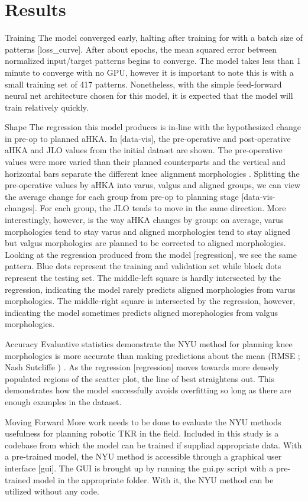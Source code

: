 \documentclass{article}
\begin{document}
	
\section{Results}

Training
	The model converged early, halting after training for \epochs with a batch size of \batchsize patterns [loss\_curve].
After about \convergence epochs, the mean squared error between normalized input/target patterns begins to converge.
The model takes less than 1 minute to converge with no GPU, however it is important to note this is with a small training set of 417 patterns.
Nonetheless, with the simple feed-forward neural net architecture chosen for this model, it is expected that the model will train relatively quickly. 

Shape
	The regression this model produces is in-line with the hypothesized change in pre-op to planned aHKA.
In [data-vis], the pre-operative and post-operative aHKA and JLO values from the initial dataset are shown.
The pre-operative values were more varied than their planned counterparts and the vertical and horizontal bars separate the different knee alignment morphologies \cite{cpak-paper}.
Splitting the pre-operative values by aHKA into varus, valgus and aligned groups, we can view the average change for each group from pre-op to planning stage [data-vis-changes].
For each group, the JLO tends to move in the same direction. More interestingly, however, is the way aHKA changes by group: 
on average, varus morphologies tend to stay varus and aligned morphologies tend to stay aligned but valgus morphologies are planned to be corrected to aligned morphologies.
Looking at the regression produced from the model [regression], we see the same pattern.
Blue dots represent the training and validation set while block dots represent the testing set.
The middle-left square is hardly intersected by the regression, indicating the model rarely predicts aligned morphologies from varus morphologies.
The middle-right square is intersected by the regression, however, indicating the model sometimes predicts aligned morephologies from valgus morphologies.

Accuracy
	Evaluative statistics demonstrate the NYU method for planning knee morphologies is more accurate than making predictions about the mean
(RMSE \mse; Nash Sutcliffe \ns) \cite{goodness-of-fit}. 
As the regression [regression] moves towards more densely populated regions of the scatter plot, the line of best straightens out.
This demonstrates how the model successfully avoids overfitting so long as there are enough examples in the dataset.

Moving Forward
	More work needs to be done to evaluate the NYU methods usefulness for planning robotic TKR in the field. Included in this study is a codebase from which the model can be trained if suppliad appropriate data. With a pre-trained model, the NYU method is accessible through a graphical user interface [gui]. The GUI is brought up by running the gui.py script with a pre-trained model in the appropriate folder. With it, the NYU method can be utilized without any code.

\medskip

\printbibliography
\end{document}

